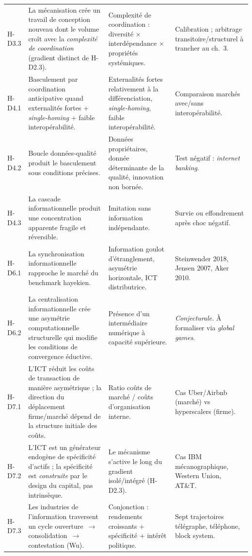 \begin{landscape}
\begin{longtable}{p{1.6cm}p{6.5cm}p{6cm}p{4cm}}
\addlinespace
H-D3.3 & La mécanisation crée un travail de conception nouveau dont le volume croît avec la \emph{complexité de coordination} (gradient distinct de H-D2.3). & Complexité de coordination : diversité × interdépendance × propriétés systémiques. & Calibration ; arbitrage transitoire/structurel à trancher au ch.~3. \\
\addlinespace
H-D4.1 & Basculement par coordination anticipative quand externalités fortes + \emph{single-homing} + faible interopérabilité. & Externalités fortes relativement à la différenciation, \emph{single-homing}, faible interopérabilité. & Comparaison marchés avec/sans interopérabilité. \\
\addlinespace
H-D4.2 & Boucle données-qualité produit le basculement sous conditions précises. & Données propriétaires, donnée déterminante de la qualité, innovation non bornée. & Test négatif : \emph{internet banking}. \\
\addlinespace
H-D4.3 & La cascade informationnelle produit une concentration apparente fragile et réversible. & Imitation sans information indépendante. & Survie ou effondrement après choc négatif. \\
\addlinespace
H-D6.1 & La synchronisation informationnelle rapproche le marché du benchmark hayekien. & Information goulot d'étranglement, asymétrie horizontale, ICT distributrice. & Steinwender 2018, Jensen 2007, Aker 2010. \\
\addlinespace
H-D6.2 & La centralisation informationnelle crée une asymétrie computationnelle structurelle qui modifie les conditions de convergence éductive. & Présence d'un intermédiaire numérique à capacité supérieure. & \emph{Conjecturale.} À formaliser via \emph{global games}. \\
\addlinespace
H-D7.1 & L'ICT réduit les coûts de transaction de manière asymétrique ; la direction du déplacement firme/marché dépend de la structure initiale des coûts. & Ratio coûts de marché / coûts d'organisation interne. & Cas Uber/Airbnb (marché) vs hyperscalers (firme). \\
\addlinespace
H-D7.2 & L'ICT est un générateur endogène de spécificité d'actifs ; la spécificité est \emph{construite} par le design du capital, pas intrinsèque. & Le mécanisme s'active le long du gradient isolé/intégré (H-D2.3). & Cas IBM mécanographique, Western Union, AT\&T. \\
\addlinespace
H-D7.3 & Les industries de l'information traversent un cycle ouverture~$\to$ consolidation~$\to$ contestation (Wu). & Conjonction : rendements croissants + spécificité + intérêt politique. & Sept trajectoires télégraphe, téléphone, block system. \\

\end{longtable}
\end{landscape}
